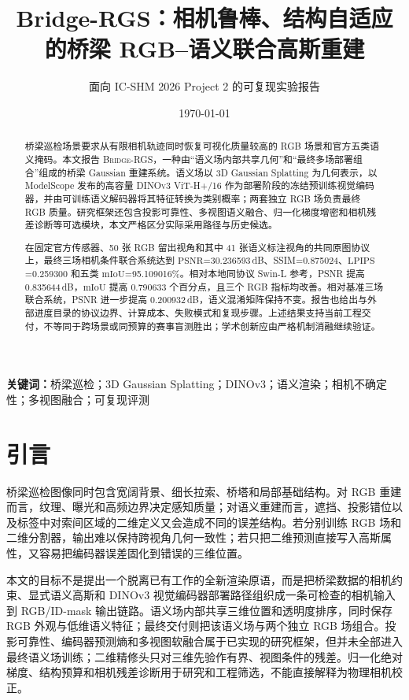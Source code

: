 \documentclass[UTF8,a4paper,11pt]{ctexart}
\title{Bridge-RGS：相机鲁棒、结构自适应的桥梁 RGB--语义联合高斯重建}
\author{面向 IC-SHM 2026 Project 2 的可复现实验报告}
\date{\today}
\newcommand{\method}{\textsc{Bridge-RGS}}
\newcommand{\DINO}{\textsc{DINOv3}}
\newcommand{\GS}{3D Gaussian Splatting}
\newcommand{\mIoU}{\ensuremath{\mathrm{mIoU}}}
\newcommand{\PSNR}{\ensuremath{\mathrm{PSNR}}}
\newcommand{\LPIPS}{\ensuremath{\mathrm{LPIPS}}}
\begin{document}
\maketitle
\begin{abstract}
桥梁巡检场景要求从有限相机轨迹同时恢复可视化质量较高的 RGB 场景和官方五类语义掩码。本文报告 \method{}，一种由“语义场内部共享几何”和“最终多场部署组合”组成的桥梁 Gaussian 重建系统。语义场以 \GS{} 为几何表示，以 ModelScope 发布的高容量 \DINO{} ViT-H+/16 作为部署阶段的冻结预训练视觉编码器，并由可训练语义解码器将其特征转换为类别概率；两套独立 RGB 场负责最终 RGB 质量。研究框架还包含投影可靠性、多视图语义融合、归一化梯度增密和相机残差诊断等可选模块，本文严格区分实际采用路径与历史候选。

在固定官方传感器、50 张 RGB 留出视角和其中 41 张语义标注视角的共同原图协议上，最终三场相机条件联合系统达到 \PSNR{}=30.236593\,dB、SSIM=0.875024、\LPIPS{}=0.259300 和五类 \mIoU{}=95.109016\%。相对本地同协议 Swin-L 参考，PSNR 提高 0.835644\,dB，\mIoU{} 提高 0.790633 个百分点，且三个 RGB 指标均改善。相对基准三场联合系统，PSNR 进一步提高 0.200932\,dB，语义混淆矩阵保持不变。报告也给出与外部进度目录的协议边界、计算成本、失败模式和复现步骤。上述结果支持当前工程交付，不等同于跨场景或同预算的赛事盲测胜出；学术创新应由严格机制消融继续验证。
\end{abstract}
\noindent\textbf{关键词：}桥梁巡检；3D Gaussian Splatting；DINOv3；语义渲染；相机不确定性；多视图融合；可复现评测

\section{引言}
桥梁巡检图像同时包含宽阔背景、细长拉索、桥塔和局部基础结构。对 RGB 重建而言，纹理、曝光和高频边界决定感知质量；对语义重建而言，遮挡、投影错位以及标签中对索间区域的二维定义又会造成不同的误差结构。若分别训练 RGB 场和二维分割器，输出难以保持跨视角几何一致性；若只把二维预测直接写入高斯属性，又容易把编码器误差固化到错误的三维位置。

本文的目标不是提出一个脱离已有工作的全新渲染原语，而是把桥梁数据的相机约束、显式语义高斯和 DINOv3 视觉编码器部署路径组织成一条可检查的相机输入到 RGB/ID-mask 输出链路。语义场内部共享三维位置和透明度排序，同时保存 RGB 外观与低维语义特征；最终交付则把该语义场与两个独立 RGB 场组合。投影可靠性、编码器预测熵和多视图软融合属于已实现的研究框架，但并未全部进入最终语义场训练；二维精修头只对三维先验作有界、视图条件的残差。归一化绝对梯度、结构预算和相机残差诊断用于研究和工程筛选，不能直接解释为物理相机校正。
\end{document}
